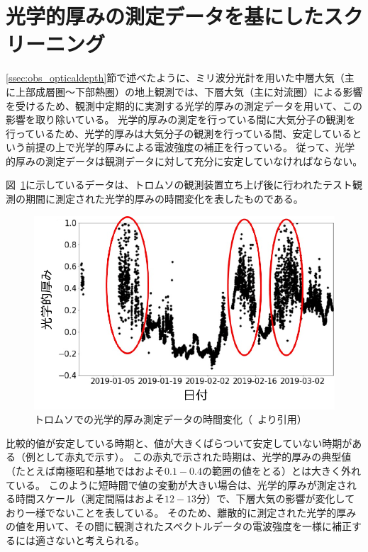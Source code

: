 \section{光学的厚みの測定データを基にしたスクリーニング}
\label{sec:screening_opticaldepth}
\ref{ssec:obs_opticaldepth}節で述べたように、ミリ波分光計を用いた中層大気（主に上部成層圏〜下部熱圏）の地上観測では、下層大気（主に対流圏）による影響を受けるため、観測中定期的に実測する光学的厚みの測定データを用いて、この影響を取り除いている。
光学的厚みの測定を行っている間に大気分子の観測を行っているため、光学的厚みは大気分子の観測を行っている間、安定しているという前提の上で光学的厚みによる電波強度の補正を行っている。
従って、光学的厚みの測定データは観測データに対して充分に安定していなければならない。\par

図~\ref{fig:optical_depth_tromsoe}に示しているデータは、トロムソの観測装置立ち上げ後に行われたテスト観測の期間に測定された光学的厚みの時間変化を表したものである。
\begin{figure}[htbp]
    \centering
    \includegraphics[width=\linewidth]{master_thesis_contents/master_thesis_fig/optical_depth_tromsoe.pdf}
    \caption{トロムソでの光学的厚み測定データの時間変化（~\cite{goto2021bachelor}より引用）}
    \label{fig:optical_depth_tromsoe}
\end{figure}
比較的値が安定している時期と、値が大きくばらついて安定していない時期がある（例として赤丸で示す）。
この赤丸で示された時期は、光学的厚みの典型値（たとえば南極昭和基地ではおよそ$0.1-0.4$の範囲の値をとる）とは大きく外れている。
このように短時間で値の変動が大きい場合は、光学的厚みが測定される時間スケール（測定間隔はおよそ$12-13$分）で、下層大気の影響が変化しており一様でないことを表している。
そのため、離散的に測定された光学的厚みの値を用いて、その間に観測されたスペクトルデータの電波強度を一様に補正するには適さないと考えられる。\par


